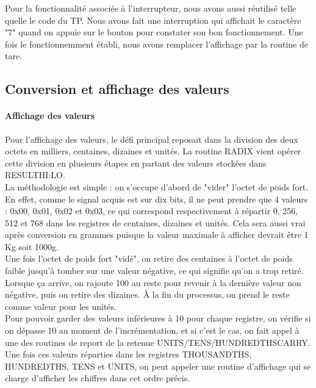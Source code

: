 \documentclass[a4paper,11pt,titlepage]{article}
\begin{document}
Pour la fonctionnalité associée à l'interrupteur, nous avons aussi réutilisé telle quelle le code du TP. Nous avons fait une interruption qui affichait le caractère "7" quand on appuie sur le bouton pour constater son bon fonctionnement. Une fois le fonctionnemment établi, nous avons remplacer l'affichage par la routine de tare.

\subsection{Conversion et affichage des valeurs}

\paragraph{Affichage des valeurs}

Pour l'affichage des valeurs, le défi principal reposait dans la division des deux octets en milliers, centaines, dizaines et unités. La routine RADIX vient opérer cette division en plusieurs étapes en partant des valeurs stockées dans RESULTHI:LO.\\

La méthodologie est simple : on s'occupe d'abord de "vider" l'octet de poids fort. En effet, comme le signal acquis est sur dix bits, il ne peut prendre que 4 valeurs : 0x00, 0x01, 0x02 et 0x03, ce qui correspond respectivement à répartir 0, 256, 512 et 768 dans les registres de centaines, dizaines et unités. Cela sera aussi vrai après conversion en grammes puisque la valeur maximale à afficher devrait être 1 Kg soit 1000g.\\

Une fois l'octet de poids fort "vidé", on retire des centaines à l'octet de poids faible jusqu'à tomber sur une valeur négative, ce qui signifie qu'on a trop retiré. Lorsque ça arrive, on rajoute 100 au reste pour revenir à la dernière valeur non négative, puis on retire des dizaines. À la fin du processus, on prend le reste comme valeur pour les unités.\\

Pour pouvoir garder des valeurs inférieures à 10 pour chaque registre, on vérifie si on dépasse 10 au moment de l'incrémentation, et si c'est le cas, on fait appel à une des routines de report de la retenue UNITS/TENS/HUNDREDTHS\textunderscore CARRY.\\

Une fois ces valeurs réparties dans les registres THOUSANDTHS, HUNDREDTHS, TENS et UNITS, on peut appeler une routine d'affichage qui se charge d'afficher les chiffres dans cet ordre précis.
\end{document}

